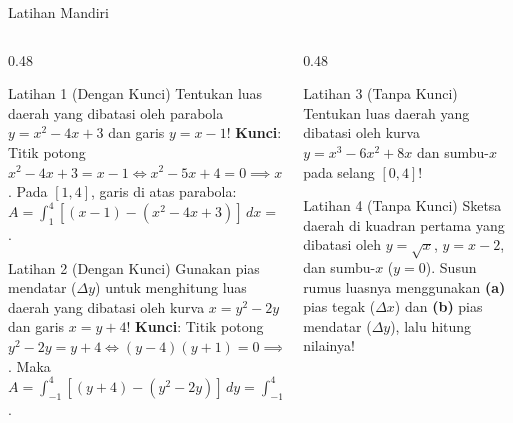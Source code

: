 \documentclass[aspectratio=43,10pt]{beamer}
\begin{document}
\begin{frame}{Latihan Mandiri}
    \begin{columns}[T]
        \begin{column}{0.48\textwidth}
            \begin{exampleblock}{Latihan 1 (Dengan Kunci)}
                \scriptsize
                Tentukan luas daerah yang dibatasi oleh parabola $y = x^2 - 4x + 3$ dan garis $y = x - 1$!
                \vskip 2pt
                {\tiny \color{TealCyan} \textbf{Kunci}: Titik potong $x^2 - 4x + 3 = x - 1 \iff x^2 - 5x + 4 = 0 \implies x = 1, 4$. Pada $[1, 4]$, garis di atas parabola: $A = \int_1^4 [(x - 1) - (x^2 - 4x + 3)]\,dx = \int_1^4 (-x^2 + 5x - 4)\,dx = \mathbf{\frac{9}{2}}$.}
            \end{exampleblock}

            \begin{exampleblock}{Latihan 2 (Dengan Kunci)}
                \scriptsize
                Gunakan pias mendatar ($\Delta y$) untuk menghitung luas daerah yang dibatasi oleh kurva $x = y^2 - 2y$ dan garis $x = y + 4$!
                \vskip 2pt
                {\tiny \color{TealCyan} \textbf{Kunci}: Titik potong $y^2 - 2y = y + 4 \iff (y - 4)(y + 1) = 0 \implies y = -1, 4$. Maka $A = \int_{-1}^4 [(y + 4) - (y^2 - 2y)]\,dy = \int_{-1}^4 (4 + 3y - y^2)\,dy = \mathbf{\frac{125}{6}}$.}
            \end{exampleblock}
        \end{column}

        \begin{column}{0.48\textwidth}
            \begin{block}{Latihan 3 (Tanpa Kunci)}
                \scriptsize
                Tentukan luas daerah yang dibatasi oleh kurva $y = x^3 - 6x^2 + 8x$ dan sumbu-$x$ pada selang $[0, 4]$!
            \end{block}

            \begin{block}{Latihan 4 (Tanpa Kunci)}
                \scriptsize
                Sketsa daerah di kuadran pertama yang dibatasi oleh $y = \sqrt{x}$, $y = x - 2$, dan sumbu-$x$ ($y = 0$). Susun rumus luasnya menggunakan \textbf{(a)} pias tegak ($\Delta x$) dan \textbf{(b)} pias mendatar ($\Delta y$), lalu hitung nilainya!
            \end{block}
        \end{column}
    \end{columns}
\end{frame}
\end{document}
